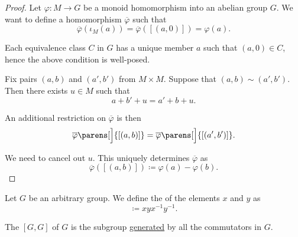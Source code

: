 \begin{proof}
  Let \( \varphi: M \to G \) be a monoid homomorphism into an abelian group \( G \). We want to define a homomorphism \( \overline{\varphi} \) such that
  \begin{equation*}
    \overline{\varphi}(\iota_M(a)) = \overline{\varphi}([(a, 0)]) = \varphi(a).
  \end{equation*}

  Each equivalence class \( C \) in \( G \) has a unique member \( a \) such that \( (a, 0) \in C \), hence the above condition is well-posed.

  Fix pairs \( (a, b) \) and \( (a', b') \) from \( M \times M \). Suppose that \( (a, b) \sim (a', b') \). Then there exists \( u \in M \) such that
  \begin{equation*}
    a + b' + u = a' + b + u.
  \end{equation*}

  An additional restriction on \( \overline{\varphi} \) is then
  \begin{equation*}
    \overline{\varphi}\parens[\Big]{ [(a, b)] }
    =
    \overline{\varphi}\parens[\Big]{ [(a', b')] }.
  \end{equation*}

  We need to cancel out \( u \). This uniquely determines \( \overline{\varphi} \) as
  \begin{equation*}
    \overline{\varphi}([(a, b)]) \coloneqq \varphi(a) - \varphi(b).
  \end{equation*}
\end{proof}

\begin{definition}\label{def:group_commutator}
  Let \( G \) be an arbitrary group. We define the  of the elements \( x \) and \( y \) as
  \begin{equation*}
    [x, y] \coloneqq xyx^{-1}y^{-1}.
  \end{equation*}

  The  \( [G, G] \) of \( G \) is the subgroup \hyperref[def:group/submodel]{generated} by all the commutators in \( G \).
\end{definition}

